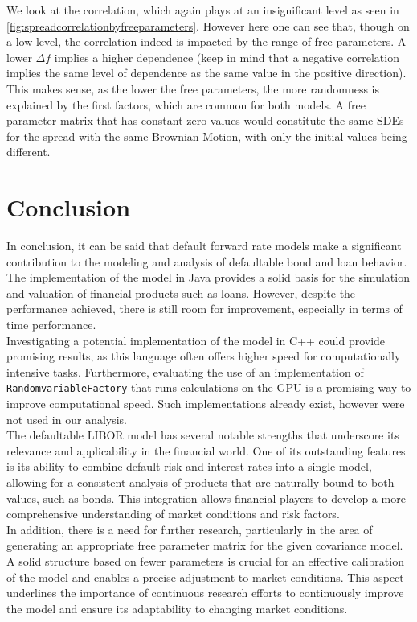 \documentclass[12pt]{article}
\begin{document}
	We look at the correlation, which again plays at an insignificant level as seen in \cref{fig:spreadcorrelationbyfreeparameters}. However here one can see that, though on a low level, the correlation indeed is impacted by the range of free parameters. A lower $\Delta f$ implies a higher dependence (keep in mind that a negative correlation implies the same level of dependence as the same value in the positive direction). This makes sense, as the lower the free parameters, the more randomness is explained by the first factors, which are common for both models. A free parameter matrix that has constant zero values would constitute the same SDEs for the spread with the same Brownian Motion, with only the initial values being different.
	
		
	\pagebreak
	\section{Conclusion}\label{sec:conclusion}
	In conclusion, it can be said that default forward rate models make a significant contribution to the modeling and analysis of defaultable bond and loan behavior. The implementation of the model in Java provides a solid basis for the simulation and valuation of financial products such as loans. However, despite the performance achieved, there is still room for improvement, especially in terms of time performance.\\
	Investigating a potential implementation of the model in C++ could provide promising results, as this language often offers higher speed for computationally intensive tasks. Furthermore, evaluating the use of an implementation of \texttt{RandomvariableFactory} that runs calculations on the GPU is a promising way to improve computational speed. Such implementations already exist, however were not used in our analysis.\\
	The defaultable LIBOR model has several notable strengths that underscore its relevance and applicability in the financial world. One of its outstanding features is its ability to combine default risk and interest rates into a single model, allowing for a consistent analysis of products that are naturally bound to both values, such as bonds. This integration allows financial players to develop a more comprehensive understanding of market conditions and risk factors.\\
	In addition, there is a need for further research, particularly in the area of generating an appropriate free parameter matrix for the given covariance model. A solid structure based on fewer parameters is crucial for an effective calibration of the model and enables a precise adjustment to market conditions. This aspect underlines the importance of continuous research efforts to continuously improve the model and ensure its adaptability to changing market conditions.\\
\end{document}
